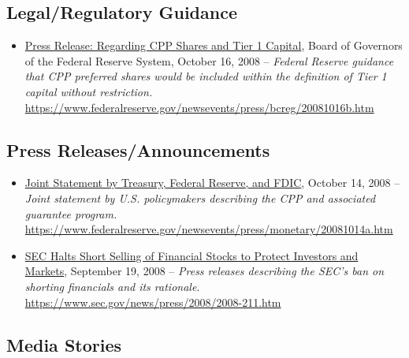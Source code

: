 \documentclass[12pt]{article}
\begin{document}
\subsection{Legal/Regulatory Guidance}

\begin{itemize}
\item
\ul{Press Release: Regarding CPP Shares and Tier 1 Capital}, Board of Governors of the Federal Reserve System, October 16, 2008 -- \emph{Federal Reserve guidance that CPP preferred shares would be included within the definition of Tier 1 capital without restriction.} \url{https://www.federalreserve.gov/newsevents/press/bcreg/20081016b.htm}

\end{itemize}

\subsection{Press Releases/Announcements}

\begin{itemize}
 \item
 \ul{Joint Statement by Treasury, Federal Reserve, and FDIC}, October 14, 2008 -- \emph{Joint statement by U.S. policymakers describing the CPP and associated guarantee program.} \url{https://www.federalreserve.gov/newsevents/press/monetary/20081014a.htm}
 \item
 \ul{SEC Halts Short Selling of Financial Stocks to Protect Investors and Markets}, September 19, 2008 -- \emph{Press releases describing the SEC's ban on shorting financials and its rationale.} \url{https://www.sec.gov/news/press/2008/2008-211.htm}
 
\end{itemize}

\subsection{Media Stories}
\end{document}

